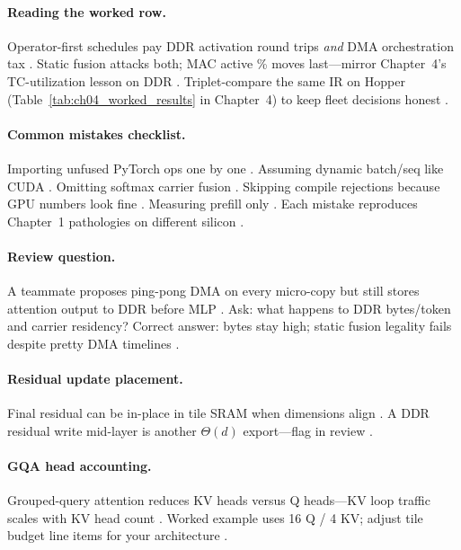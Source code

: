 \paragraph{Reading the worked row.}
Operator-first schedules pay DDR activation round trips \emph{and} DMA orchestration tax \citep{memoryfloor2026,taxbreak2026}.
Static fusion attacks both; MAC active \% moves last---mirror Chapter~4's TC-utilization lesson on DDR \citep{patel2025llminference,nvidia2022hopper}.
Triplet-compare the same IR on Hopper (Table~\ref{tab:ch04_worked_results} in Chapter~4) to keep fleet decisions honest \citep{yirage2026,chen2020compilerbasedhardw}.

\paragraph{Common mistakes checklist.}
Importing unfused PyTorch ops one by one \citep{taxbreak2026,amd2024xdna}.
Assuming dynamic batch/seq like CUDA \citep{kwon2023vllm,yirage2026}.
Omitting softmax carrier fusion \citep{dao2022flashattention,memoryfloor2026}.
Skipping compile rejections because GPU numbers look fine \citep{patel2025llminference}.
Measuring prefill only \citep{dao2023flashdecoding,amd2024aie}.
Each mistake reproduces Chapter~1 pathologies on different silicon \citep{taxbreak2026,yirage2026}.

\paragraph{Review question.}
A teammate proposes ping-pong DMA on every micro-copy but still stores attention output to DDR before MLP \citep{memoryfloor2026,dao2022flashattention}.
Ask: what happens to DDR bytes/token and carrier residency? \citep{yirage2026,amd2024aie}
Correct answer: bytes stay high; static fusion legality fails despite pretty DMA timelines \citep{memoryfloor2026,patel2025llminference}.

\paragraph{Residual update placement.}
Final residual can be in-place in tile SRAM when dimensions align \citep{dao2022flashattention,yirage2026}.
A DDR residual write mid-layer is another $\Theta(d)$ export---flag in review \citep{memoryfloor2026,chen2020compilerbasedhardw}.

\paragraph{GQA head accounting.}
Grouped-query attention reduces KV heads versus Q heads---KV loop traffic scales with KV head count \citep{kwon2023vllm,dao2022flashattention,taxbreak2026}.
Worked example uses 16 Q / 4 KV; adjust tile budget line items for your architecture \citep{yirage2026,patel2025llminference,amd2024aie}.

